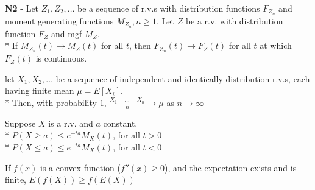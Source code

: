 \documentclass[10pt, landscape]{article}
\begin{document}
\begin{multicols*}{3}
    \textbf{N2} - Let $Z_1, Z_2, \dots$ be a sequence of r.v.s with distribution functions $F_{Z_n}$ and moment generating functions $M_{Z_n}, n \geq 1$.
    Let $Z$ be a r.v. with distribution function $F_Z$ and mgf $M_Z$. 
    \\* If $M_{Z_n} (t) \to M_Z(t)$ for all $t$, then $F_{Z_n}(t) \to F_Z(t)$ for all $t$ at which $F_Z(t)$ is continuous.

    let $X_1, X_2, \dots$ be a sequence of independent and identically distribution r.v.s, each having finite mean $\mu = E[X_i]$. 
    \\* Then, with probability  $1$, 
    $\frac{X_1 + \dots + X_n}{n} \to \mu$ as $n \to \infty$

    Suppose $X$ is a r.v. and $a$ constant. 
    \\* $P(X \geq a) \leq e^{-ta} M_X(t)$, for all $t > 0$
    \\* $P(X \leq a) \leq e^{-ta} M_X(t)$, for all $t < 0$

    If $f(x)$ is a convex function ($f''(x) \geq 0$), and the expectation exists and is finite, $E(f(X)) \geq f(E(X))$

    \begin{center}
    \end{center}

  \end{multicols*}

  
\end{document}
